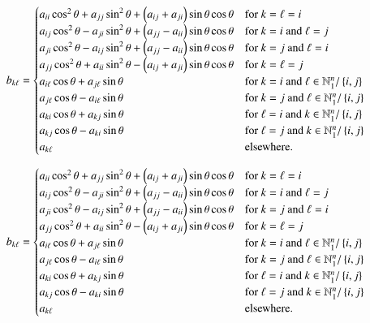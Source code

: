 \documentclass[11pt,english,a4paper]{article}
\begin{document}
\begin{flushleft}
\begin{align*}
b_{k\ell} = \begin{cases} a_{ii} \cos^2\theta  + a_{jj}\sin^2 \theta + \left({a_{ij} + a_{ji}}\right)\sin\theta\cos\theta & \text{for $k=\ell=i$} \\ a_{ij}\cos^2\theta - a_{ji}\sin^2\theta + \left({a_{jj}-a_{ii}}\right)\sin\theta\cos\theta & \text{for $k=i$ and $\ell = j$} \\ a_{ji}\cos^2\theta - a_{ij}\sin^2\theta + \left({a_{jj}-a_{ii}}\right)\sin\theta\cos\theta & \text{for $k=j$ and $\ell=i$} \\ a_{jj} \cos^2\theta  + a_{ii}\sin^2 \theta - \left({a_{ij} + a_{ji}}\right)\sin\theta\cos\theta & \text{for $k=\ell=j$} \\ a_{i \ell} \cos\theta +  a_{j\ell} \sin\theta & \text{for $k=i$ and $\ell\in\mathbb{N}_1^n / \left\lbrace{i,j}\right\rbrace$} \\ a_{j\ell} \cos\theta - a_{i\ell}\sin\theta & \text{for $k=j$ and $\ell\in\mathbb{N}_1^n / \left\lbrace{i,j}\right\rbrace$} \\ a_{ki} \cos\theta + a_{kj}\sin\theta & \text{for $\ell=i$ and $k\in\mathbb{N}_1^n / \left\lbrace{i,j}\right\rbrace$} \\ a_{kj}\cos\theta - a_{ki}\sin\theta & \text{for $\ell=j$ and $k\in\mathbb{N}_1^n / \left\lbrace{i,j}\right\rbrace$} \\ a_{k\ell} & \text{elsewhere.}\end{cases}
\end{align*}

\begin{align*}
b_{k\ell} = \begin{cases} a_{ii} \cos^2\theta  + a_{jj}\sin^2 \theta + \left({a_{ij} + a_{ji}}\right)\sin\theta\cos\theta & \text{for $k=\ell=i$} \\ a_{ij}\cos^2\theta - a_{ji}\sin^2\theta + \left({a_{jj}-a_{ii}}\right)\sin\theta\cos\theta & \text{for $k=i$ and $\ell = j$} \\ a_{ji}\cos^2\theta - a_{ij}\sin^2\theta + \left({a_{jj}-a_{ii}}\right)\sin\theta\cos\theta & \text{for $k=j$ and $\ell=i$} \\ a_{jj} \cos^2\theta  + a_{ii}\sin^2 \theta - \left({a_{ij} + a_{ji}}\right)\sin\theta\cos\theta & \text{for $k=\ell=j$} \\ a_{i \ell} \cos\theta +  a_{j\ell} \sin\theta & \text{for $k=i$ and $\ell\in\mathbb{N}_1^n / \left\lbrace{i,j}\right\rbrace$} \\ a_{j\ell} \cos\theta - a_{i\ell}\sin\theta & \text{for $k=j$ and $\ell\in\mathbb{N}_1^n / \left\lbrace{i,j}\right\rbrace$} \\ a_{ki} \cos\theta + a_{kj}\sin\theta & \text{for $\ell=i$ and $k\in\mathbb{N}_1^n / \left\lbrace{i,j}\right\rbrace$} \\ a_{kj}\cos\theta - a_{ki}\sin\theta & \text{for $\ell=j$ and $k\in\mathbb{N}_1^n / \left\lbrace{i,j}\right\rbrace$} \\ a_{k\ell} & \text{elsewhere.}\end{cases}
\end{align*}



\end{flushleft}
\end{document}
